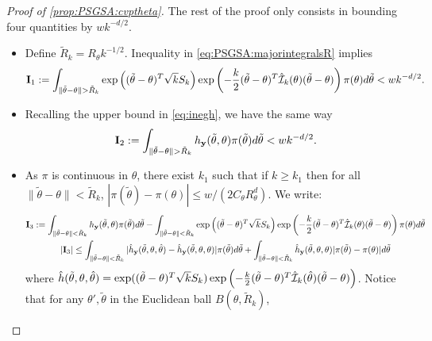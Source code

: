 \begin{proof}[Proof of \cref{prop:PSGSA:cvptheta}]
    The rest of the proof only consists in bounding  four  quantities by $ w k^{-d/2} $.
    \begin{itemize}
        \item Define $\tilde R_k=R_\theta k^{-1/2}$. %
        Inequality in \cref{eq:PSGSA:majorintegralsR} implies
        \begin{equation}
            \mbf I_1 := \int_{\|\tilde\theta-\theta\|>\tilde R_k} \exp\left((\tilde\theta-\theta)^T\sqrt{k}S_k\right)\exp\left( -\frac{k}{2}(\tilde\theta-\theta)^T\hat\cI_k(\theta)(\tilde\theta-\theta) \right)\pi(\theta)d\tilde\theta < w k^{-d/2}.
        \end{equation}
        \item Recalling the upper bound in \cref{eq:inegh}, we have the same way
            \begin{equation}
                \mbf I_2 := \int_{\|\tilde\theta-\theta\|>\tilde R_k} h_{\mbf y}(\tilde\theta,\theta)\pi(\tilde\theta)d\tilde\theta < w k^{-d/2}.
            \end{equation}
        \item  
        As $\pi$ is continuous in $\theta$, 
        there exist $k_1$ such that if $k\geq k_1$ then for all $\|\tilde\theta-\theta\|<\tilde R_k$, $|\pi(\tilde\theta)-\pi(\theta)|\leq w/(2C_\theta R_\theta^d)$. %
        We write:
            \begin{multline}\label{eq:continuityofHatIk}
               \mbf I_3 := \int_{\|\tilde\theta-\theta\|<\tilde R_k} h_{\mbf y}(\tilde\theta,\theta)\pi(\tilde\theta)d\tilde\theta  
                     - \int_{\|\tilde\theta-\theta\|<\tilde R_k}\exp\left((\tilde\theta-\theta)^T\sqrt{k}S_k\right)\exp\left(-\frac{k}{2}(\tilde\theta-\theta)^T\hat\cI_k(\theta)(\tilde\theta-\theta)\right)\pi(\theta)d\tilde\theta \\ %
                    |\mbf I_3| \leq \int_{\|\tilde\theta-\theta\|<\tilde R_k}|\hat h_{\mbf y}(\tilde\theta,\theta,\hat\theta) - \hat h_{\mbf y}(\tilde\theta,\theta,\theta) |\pi(\tilde\theta)d\tilde\theta + \int_{\|\tilde\theta-\theta\|<\tilde R_k}\hat h_{\mbf y}(\tilde\theta,\theta,\theta)|\pi(\tilde\theta)-\pi(\theta)|d\tilde\theta
            \end{multline}
        where $\hat h(\tilde\theta,\theta,\hat\theta)=\exp((\tilde\theta-\theta)^T\sqrt{k}S_k)\exp\left(-\frac{k}{2}(\tilde\theta-\theta)^T\hat{\mathcal{I}}_k(\hat\theta)(\tilde\theta-\theta)\right)$. {Notice that for any $\theta',\tilde\theta$ in the Euclidean ball $B(\theta,\tilde R_k)$,}

\end{itemize}
\end{proof}
